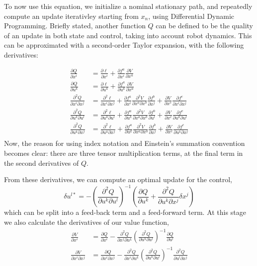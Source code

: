 \documentclass[a4paper,12pt]{article}
\begin{document}
To now use this equation, we initialize a nominal stationary path, and repeatedly compute an update iterativley starting from $x_n$, using Differential Dynamic Programming. Briefly stated, another function $Q$ can be defined to be the quality of an update in both state and control, taking into account robot dynamics. This can be approximated with a second-order Taylor expansion, with the following derivatives:

$$
	\begin{aligned}
		\frac {\partial Q}{\partial x^i} &= \frac{\partial \ell}{\partial x^i} + \frac{\partial f^a}{\partial x^i} \frac{\partial V}{\partial x^a} \\ 
		\frac {\partial Q}{\partial u^k} &= \frac{\partial \ell}{\partial u^k} + \frac{\partial f^a}{\partial u^k} \frac{\partial V}{\partial x^a} \\ 
		\frac {\partial^2 Q}{\partial x^i \partial x^j} &= \frac{\partial^2 \ell}{\partial x^i \partial x^j} + \frac{\partial f^a}{\partial x^i} \frac{\partial^2 V}{\partial x^a \partial x^b}\frac{\partial f^b}{\partial x^j} + \frac {\partial V}{\partial x^c} \frac{\partial f^c}{\partial x^i \partial x^j} \\ 
		\frac {\partial^2 Q}{\partial u^k \partial u^l} &= \frac{\partial^2 \ell}{\partial u^k \partial u^l} + \frac{\partial f^a}{\partial u^k} \frac{\partial^2 V}{\partial x^a \partial x^b}\frac{\partial f^b}{\partial u^l} + \frac {\partial V}{\partial x^c} \frac{\partial f^c}{\partial u^k \partial u^l}\\ 
		\frac {\partial^2 Q}{\partial u^k \partial x^j} &= \frac{\partial^2 \ell}{\partial u^k \partial x^j} + \frac{\partial f^a}{\partial u^k} \frac{\partial^2 V}{\partial x^a \partial x^b}\frac{\partial f^b}{\partial x^j} + \frac {\partial V}{\partial x^c} \frac{\partial f^c}{\partial u^k \partial x^j}\\ 
	\end{aligned}
$$
Now, the reason for using index notation and Einstein's summation convention becomes clear: there are three tensor multiplication terms, at the final term in the second derivatives of $Q$. 

From these derivatives, we can compute an optimal update for the control,
$$
\delta u^{l*} = -\left (\frac {\partial^2 Q}{\partial u^k \partial u^l}\right )^{-1} \left (\frac {\partial Q}{\partial u^k} + \frac {\partial^2 Q}{\partial u^k \partial x^j} \delta x^j \right)
$$
which can be split into a feed-back term and a feed-forward term. At this stage we also calculate the derivatives of our value function,
$$
\begin{aligned}
\frac{\partial V}{\partial x^i} &= \frac {\partial Q}{\partial x^i} - \frac {\partial^2 Q}{\partial x^j \partial u^k}\left (\frac {\partial^2 Q}{\partial u^k \partial u^l}\right )^{-1}\frac {\partial Q}{\partial u^l}\\
\frac{\partial V}{\partial x^i \partial x^j} &= \frac {\partial Q}{\partial x^i \partial x^j} - \frac {\partial^2 Q}{\partial x^i \partial u^k} \left(\frac {\partial^2 Q}{\partial u^k \partial u^l} \right )^{-1}\frac {\partial^2 Q}{\partial u^l \partial x^j}
\end{aligned}
$$
\end{document}
